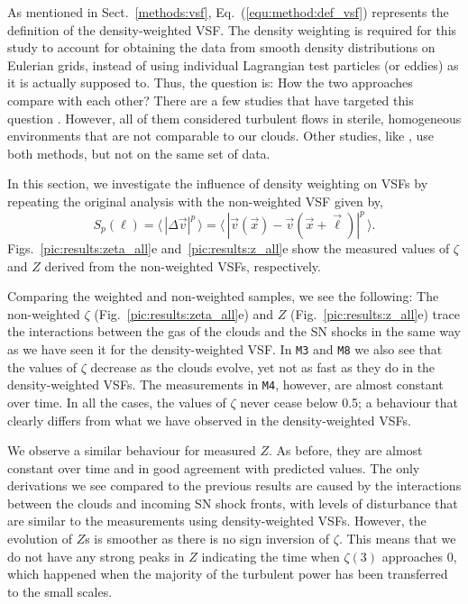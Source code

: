 As mentioned in Sect.~\ref{methods:vsf}, Eq.~(\ref{equ:method:def_vsf}) represents the definition of the density-weighted VSF.
The density weighting is required for this study to account for obtaining the data from smooth density distributions on Eulerian grids, instead of using individual Lagrangian test particles (or eddies) as it is actually supposed to.
Thus, the question is: How the two approaches compare with each other?
There are a few studies that have targeted this question \citep[e.g.,][]{Benzi1993,Benzi2010,Gotoh2002,Schmidt2008}. 
However, all of them considered turbulent flows in sterile, homogeneous environments that are not comparable to our clouds.
Other studies, like \citet{Padoan2016a}, use both methods, but not on the same set of data. 

In this section, we investigate the influence of density weighting on VSFs by repeating the original analysis with the non-weighted VSF given by,
\begin{equation}
	\mathit{S}_p (\ell) = \langle \, |\Delta \vec{v}|^p  \, \rangle = \langle \, |\vec{v}(\vec{x}) - \vec{v}(\vec{x} + \vec{\ell})|^p  \, \rangle .
    \label{equ:results:def_vsf_no}
\end{equation}
Figs.~\ref{pic:results:zeta_all}e and~\ref{pic:results:z_all}e show the measured values of $\zeta$ and $Z$ derived from the non-weighted VSFs, respectively.

Comparing the weighted and non-weighted samples, we see the following:
The non-weighted $\zeta$ (Fig.~\ref{pic:results:zeta_all}e) and $Z$ (Fig.~\ref{pic:results:z_all}e) trace the interactions between the gas of the clouds and the SN shocks in the same way as we have seen it for the density-weighted VSF.
In \texttt{M3} and \texttt{M8} we also see that the values of $\zeta$ decrease as the clouds evolve, yet not as fast as they do in the density-weighted VSFs. 
The measurements in \texttt{M4}, however, are almost constant over time. 
In all the cases, the values of $\zeta$ never cease below 0.5; a behaviour that clearly differs from what we have observed in the density-weighted VSFs.

We observe a similar behaviour for measured $Z$. 
As before, they are almost constant over time and in good agreement with predicted values.
The only derivations we see compared to the previous results are caused by the interactions between the clouds and incoming SN shock fronts, with levels of disturbance that are similar to the measurements using density-weighted VSFs. 
However, the evolution of $Z$s is smoother as there is no sign inversion of $\zeta$.
This means that we do not have any strong peaks in $Z$ indicating the time when $\zeta(3)$ approaches 0, which happened when the majority of the turbulent power has been transferred to the small scales. 

